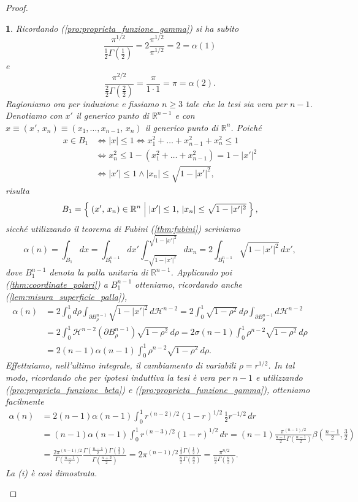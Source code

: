 \documentclass[a4paper,10pt,openright,oneside]{book}
\theoremstyle{theoremstyle}
\theoremstyle{theoremstylewoheader}
\theoremstyle{theoremstyle}
\theoremstyle{proofsecstyle}
\newtheorem{proofsec}{}
\theoremstyle{nonumberplain}
\newtheorem{proof}{Dim.}
\newcommand{\RR}{\ensuremath{\mathbb{R}}}
\newcommand{\Haus}{\ensuremath{\mathcal{H}}}
\newcommand{\abs}[1]{\ensuremath{\lvert #1 \rvert}}
\newcommand{\boundary}[1]{\ensuremath{\partial #1}}
\begin{document}
\begin{proof}
\begin{proofsec}
Ricordando (\ref{pro:proprieta_funzione_gamma}) si ha subito
\[
\frac{\pi^{1/2}}{\frac{1}{2}\Gamma\left(\frac{1}{2}\right)} = 2 \frac{\pi^{1/2}}{\pi^{1/2}} = 2 = \alpha(1)
\]
e
\[
\frac{\pi^{2/2}}{\frac{2}{2}\Gamma\left(\frac{2}{2}\right)} = \frac{\pi}{1 \cdot 1} = \pi = \alpha(2).
\] 
Ragioniamo ora per induzione e fissiamo $n \ge 3$ tale che la tesi sia vera per $n - 1$. Denotiamo con $x'$ il generico punto di $\RR^{n-1}$ e con $x \equiv (x',\, x_n) \equiv (x_1, \ldots, x_{n-1},\, x_n)$ il generico punto di $\RR^n$. Poiché
\begin{align*}
x \in B_1 &\iff \abs{x} \le 1 \iff x_1^2 + \ldots + x_{n-1}^2 + x_n^2 \le 1\\
&\iff x_n^2 \le 1 - (x_1^2 + \ldots + x_{n-1}^2 ) = 1 - \abs{x'}^2\\
&\iff \abs{x'} \le 1 \land \abs{x_n} \le \sqrt{1 - \abs{x'}^2},
\end{align*}
risulta
\[
B_1 = \Set{(x',\, x_n) \in \RR^n | \abs{x'} \le 1,\, \abs{x_n} \le \sqrt{1 - \abs{x'}^2} },
\]
sicché utilizzando il teorema di Fubini (\ref{thm:fubini}) scriviamo
\[
\alpha(n) = \int_{B_1} dx = \int_{B_1^{n-1}} dx' \int_{-\sqrt{1-\abs{x'}^2}}^{\sqrt{1 - \abs{x'}^2}} dx_n = 2\int_{B_1^{n-1}} \sqrt{1-\abs{x'}^2}\, dx',
\] 
dove $B_1^{n-1}$ denota la palla unitaria di $\RR^{n-1}$. Applicando poi (\ref{thm:coordinate_polari}) a $B_1^{n-1}$ otteniamo, ricordando anche (\ref{lem:misura_superficie_palla}),
\begin{align*}
\alpha(n) &= 2\int_0^1 d\rho \int_{\boundary{B_\rho^{n-1}}} \sqrt{1-\abs{x'}^2}\, d\Haus^{n-2} = 2\int_0^1 \sqrt{1-\rho^2}\, d\rho \int_{\boundary{B_\rho^{n-1}}} d\Haus^{n-2}\\
&= 2\int_0^1 \Haus^{n-2}(\boundary{B_\rho^{n-1}}) \sqrt{1-\rho^2}\, d\rho = 2\sigma(n-1) \int_0^1 \rho^{n-2} \sqrt{1-\rho^2}\, d\rho\\
&= 2(n-1) \alpha(n-1) \int_0^1 \rho^{n-2} \sqrt{1-\rho^2}\, d\rho.
\end{align*}
Effettuiamo, nell'ultimo integrale, il cambiamento di variabili $\rho = r^{1/2}$. In tal modo, ricordando che per ipotesi induttiva la tesi è vera per $n - 1$ e utilizzando (\ref{pro:proprieta_funzione_beta}) e (\ref{pro:proprieta_funzione_gamma}), otteniamo facilmente
\begin{align*}
\alpha(n) &= 2(n-1)\alpha(n-1) \int_0^1 r^{(n-2)/2} (1-r)^{1/2}\, \frac{1}{2}r^{-1/2}\, dr\\
&= (n-1)\alpha(n-1) \int_0^1 r^{(n-3)/2} (1-r)^{1/2}\, dr = (n-1) \frac{\pi^{(n-1)/2}}{\frac{n-1}{2} \Gamma\left(\frac{n-1}{2}\right)} \beta\left(\frac{n-1}{2}, \frac{3}{2}\right)\\
&= \frac{2\pi^{(n-1)/2}}{\Gamma\left(\frac{n-1}{2}\right)} \frac{\Gamma\left(\frac{n-1}{2}\right)\Gamma\left(\frac{3}{2}\right)}{\Gamma\left(\frac{n+2}{2}\right)} = 2\pi^{(n-1)/2}\frac{\frac{1}{2}\Gamma\left(\frac{1}{2}\right)}{\frac{n}{2}\Gamma\left(\frac{n}{2}\right)} = \frac{\pi^{n/2}}{\frac{n}{2}\Gamma\left(\frac{n}{2}\right)}.
\end{align*}
La (i) è così dimostrata.
\end{proofsec}


\end{proof}
\end{document}
